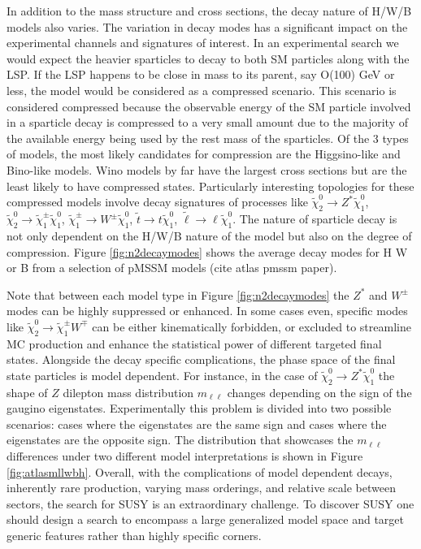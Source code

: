 In addition to the mass structure and cross sections, the decay nature of H/W/B models also varies. The variation in decay modes has a significant impact on the experimental channels and signatures of interest. In an experimental search we would expect the heavier sparticles to decay to both SM particles along with the LSP. If the LSP happens to be close in mass to its parent, say O(100) GeV or less, the model would be considered as a compressed scenario. This scenario is considered compressed because the observable energy of the SM particle involved in a sparticle decay is compressed to a very small amount due to the majority of the available energy being used by the rest mass of the sparticles. Of the 3 types of models, the most likely candidates for compression are the Higgsino-like and Bino-like models. Wino models by far have the largest cross sections but are the least likely to have compressed states. Particularly interesting topologies for these compressed models involve decay signatures of processes like $\tilde{\chi}^0_2 \rightarrow Z^*\tilde{\chi}^0_1 $, $\tilde{\chi}^0_2\rightarrow \tilde{\chi}^\pm_1 \tilde{\chi}^0_1 $, $\tilde{\chi}^\pm_1\rightarrow W^\pm \tilde{\chi}^0_1$, $\tilde{t}\rightarrow t \tilde{\chi}^0_1$, $\tilde{\ell}\rightarrow\ell \tilde{\chi}^0_1$. The nature of sparticle decay is not only dependent on the H/W/B nature of the model but also on the degree of compression. Figure \ref{fig:n2decaymodes} shows the average decay modes for H W or B from a selection of pMSSM models (cite atlas pmssm paper).


Note that between each model type in Figure \ref{fig:n2decaymodes} the $Z^*$ and $W^\pm$ modes can be highly suppressed or enhanced. In some cases even, specific modes like $\tilde{\chi}^0_2\rightarrow \tilde{\chi}_1^\pm W^\mp$ can be either kinematically forbidden, or excluded to streamline MC production and enhance the statistical power of different targeted final states. Alongside the decay specific complications, the phase space of the final state particles is model dependent. For instance, in the case of $\tilde{\chi}^0_2 \rightarrow Z^*\tilde{\chi}^0_1 $ the shape of $Z$ dilepton mass distribution $m_{\ell\ell}$  changes depending on the sign of the gaugino eigenstates. Experimentally this problem is divided into two possible scenarios: cases where the eigenstates are the same sign and cases where the eigenstates are the opposite sign. The distribution that showcases the $m_{\ell\ell}$ differences under two different model interpretations is shown in Figure \ref{fig:atlasmllwbh}. Overall, with the complications of model dependent decays, inherently rare production, varying mass orderings, and relative scale between sectors, the search for SUSY is an extraordinary challenge. To discover SUSY one should design a search to encompass a large generalized model space and target generic features rather than highly specific corners. 


